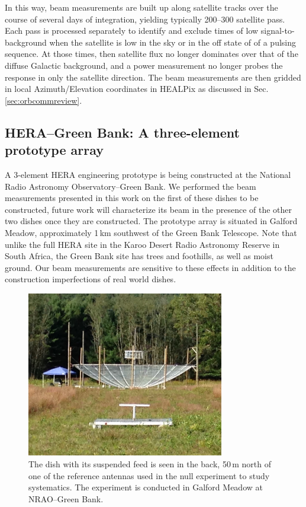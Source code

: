 \documentclass{emulateapj}
\begin{document}
In this way, beam measurements are built up along satellite tracks over the course of 
several days of integration, yielding typically 200--300 satellite pass. Each pass is 
processed separately to identify and exclude times of low signal-to-background when the 
satellite is low in the sky or in the off state of of a pulsing sequence. At those times, then 
satellite flux no longer dominates over that of the diffuse Galactic background, and a 
power measurement no longer probes the response in only the satellite direction. The beam 
measurements are then gridded in local Azimuth/Elevation coordinates in HEALPix \citep{healpix} as discussed in Sec. \ref{sec:orbcommreview}.


\subsection{HERA--Green Bank: A three-element prototype array}

A 3-element HERA engineering prototype is being constructed at the National Radio 
Astronomy Observatory--Green Bank. We performed the beam measurements presented in 
this work on the first of these dishes to be constructed, future work will characterize its beam in the presence of the other two dishes once they are constructed. The prototype array is situated in Galford Meadow, approximately 1\,km southwest of the Green Bank Telescope. Note that unlike the full HERA site in the Karoo Desert Radio Astronomy Reserve in 
South Africa, the Green Bank site has trees and foothills, as well as moist ground. Our beam measurements
are sensitive to these effects in addition to the construction imperfections of real world dishes.

\begin{figure}[h]
\includegraphics[width=3.4in]{ref_dipole_and_hera_dish.jpg}
\caption{The dish with its suspended feed is seen in the back, 50\,m north of one of the reference antennas used in the null experiment to study systematics. The experiment is conducted in Galford Meadow at NRAO--Green Bank.}
\label{fig:greenbankdishphoto}
\end{figure}
\end{document}
